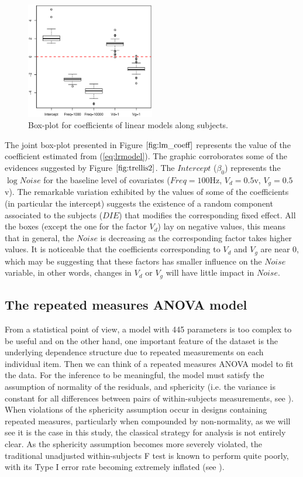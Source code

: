 \documentclass[sn-mathphys]{sn-jnl}%
\theoremstyle{thmstyleone}%
\theoremstyle{thmstyletwo}%
\theoremstyle{thmstylethree}%
\begin{document}
\begin{figure}[ht]
	\centerline{
		\includegraphics[width=0.5\textwidth]{Fig4_lm_coeff.eps}}
	\caption{Box-plot for coefficients of linear models along subjects.}
	\label{fig:lm_coeff}
\end{figure}

The joint box-plot presented in Figure $\ref{fig:lm_coeff}$ represents the value of the coefficient estimated from (\ref{eq:lrmodel}). The graphic corroborates some of the evidences suggested by Figure $\ref{fig:trellis2}$. 
The $Intercept$ ($\beta_0$) represents the $\log Noise$ for the baseline level of covariates ($Freq=100$Hz, $V_d=0.5$v, $V_g=0.5$v).
The remarkable variation exhibited by the values of some of the coefficients (in particular the intercept) suggests the existence of a random component associated to the subjects ($DIE$) that modifies the corresponding fixed effect. 
All the boxes (except the one for the factor $V_d$) lay on negative values, this means that in general, the $Noise$ is decreasing as the corresponding factor takes higher values. 
It is noticeable that the coefficients corresponding to $V_d$ and $V_g$ are near 0, which may be suggesting that these factors has smaller influence on the $Noise$ variable, in other words, changes in $V_d$ or $V_g$ will have little impact in $Noise$.

%
\subsection{The repeated measures ANOVA model} \label{sec:anovaCheck}
\noindent From a statistical point of view, a model with 445 parameters is too complex to be useful and on the other hand, one important feature of the dataset is the underlying dependence structure  due to repeated measurements on each individual item. Then we can think of a repeated measures ANOVA model to fit the data. For the inference to be meaningful, the model must satisfy the assumption of normality of the residuals, and sphericity (i.e. the variance is constant for all differences between pairs of within-subjects measurements, see \cite{BHN2000}). When violations of the sphericity assumption occur in designs containing repeated measures, particularly when compounded by non-normality, as we will see it is the case in this study, the classical strategy for analysis is not entirely clear. As the sphericity assumption becomes more severely violated, the traditional unadjusted within-subjects F test is known to perform quite poorly, with its Type I error rate becoming extremely inflated (see \cite{BHN2000}).
\end{document}
